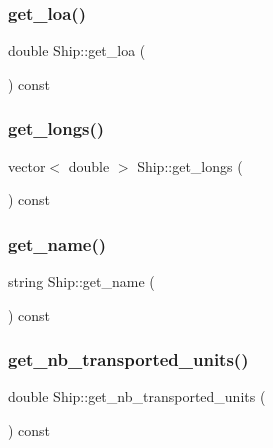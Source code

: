 \mbox{\label{class_ship_aba267883849eb02822480b2564919cdc}} 
\subsubsection{\texorpdfstring{get\_loa()}{get\_loa()}}
{\footnotesize\ttfamily double Ship\+::get\+\_\+loa (\begin{DoxyParamCaption}{ }\end{DoxyParamCaption}) const}

\mbox{\label{class_ship_a84638f50c84bfbb6b07bd73d028e97fe}} 
\subsubsection{\texorpdfstring{get\_longs()}{get\_longs()}}
{\footnotesize\ttfamily vector$<$ double $>$ Ship\+::get\+\_\+longs (\begin{DoxyParamCaption}{ }\end{DoxyParamCaption}) const}

\mbox{\label{class_ship_a748ddbd6c38b534c9aeb16c53dc4fdc3}} 
\subsubsection{\texorpdfstring{get\_name()}{get\_name()}}
{\footnotesize\ttfamily string Ship\+::get\+\_\+name (\begin{DoxyParamCaption}{ }\end{DoxyParamCaption}) const}

\mbox{\label{class_ship_a51334458c7e56cfd6fb64340dced977c}} 
\subsubsection{\texorpdfstring{get\_nb\_transported\_units()}{get\_nb\_transported\_units()}}
{\footnotesize\ttfamily double Ship\+::get\+\_\+nb\+\_\+transported\+\_\+units (\begin{DoxyParamCaption}{ }\end{DoxyParamCaption}) const}

